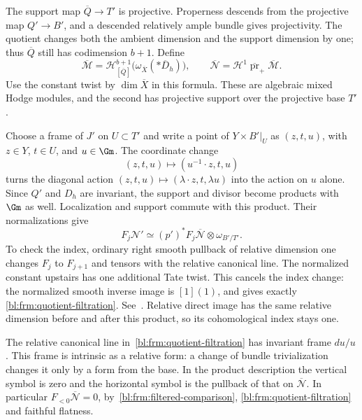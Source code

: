 The support map $\overline Q\to T'$ is projective. Properness
descends from the projective map $Q'\to B'$, and a descended
relatively ample bundle gives projectivity. The quotient changes
both the ambient dimension and the support dimension by one;
thus $\overline Q$ still has codimension $b+1$. Define
\begin{equation}\label{bl:frm:quotient-modules}
 \overline{\mathcal M}=
 \mathcal H^{b+1}_{[\overline Q]}
       \bigl(\omega_{\overline X}(*\overline D_h)\bigr),
 \qquad
 \overline{\mathcal N}
       =\mathcal H^1\overline{\operatorname{pr}}_+
                          \overline{\mathcal M}.
\end{equation}
Use the constant twist by $\dim\overline X$ in this formula.
These are algebraic mixed Hodge modules, and the second has
projective support over the projective base $T'$.

Choose a frame of $J'$ on $U\subset T'$ and write a point of
$Y\times B'|_U$ as $(z,t,u)$, with $z\in Y$, $t\in U$, and
$u\in\Gm$. The coordinate change
\begin{equation}\label{bl:frm:untwisting}
 (z,t,u)\longmapsto(u^{-1}\!\cdot z,t,u)
\end{equation}
turns the diagonal action
$(z,t,u)\mapsto(\lambda\!\cdot z,t,\lambda u)$ into the action
on $u$ alone. Since $Q'$ and $D_h$ are invariant, the support
and divisor become products with $\Gm$ as well. Localization
and support commute with this product. Their normalizations give
\begin{equation}\label{bl:frm:quotient-filtration}
 F_j\mathcal N'
   \simeq (p')^*F_j\overline{\mathcal N}
                     \otimes\omega_{B'/T'}.
\end{equation}
To check the index, ordinary right smooth pullback of relative
dimension one changes $F_j$ to $F_{j+1}$ and tensors with the
relative canonical line. The normalized constant upstairs has
one additional Tate twist. This cancels the index change: the
normalized smooth inverse image is $[1](1)$, and gives exactly
\eqref{bl:frm:quotient-filtration}. See~\cite[Section~30]{Schnell2014}.
Relative direct image has the same relative dimension before and
after this product, so its cohomological index stays one.

The relative canonical line in~\eqref{bl:frm:quotient-filtration}
has invariant frame $du/u$. This frame is intrinsic as a relative
form: a change of bundle trivialization changes it only by a
form from the base. In the product description the vertical
symbol is zero and the horizontal symbol is the pullback of that
on $\overline{\mathcal N}$. In particular
$F_{<0}\overline{\mathcal N}=0$, by~\eqref{bl:frm:filtered-comparison},
\eqref{bl:frm:quotient-filtration} and faithful flatness.

